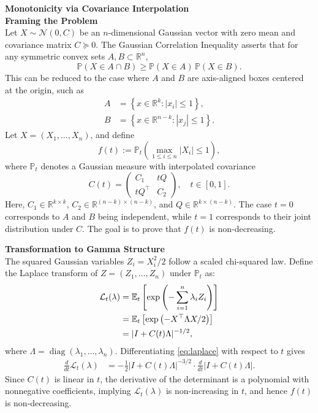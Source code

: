 \begin{technical}
{\Large\textbf{Monotonicity via Covariance Interpolation}}\\[0.7em]

\noindent\textbf{Framing the Problem}\\[0.5em]
Let \( X \sim \mathcal{N}(0, C) \) be an \( n \)-dimensional Gaussian vector with zero mean and covariance matrix \( C \succcurlyeq 0 \). The Gaussian Correlation Inequality asserts that for any symmetric convex sets \( A, B \subset \mathbb{R}^n \),
\[
\mathbb{P}(X \in A \cap B) \ge \mathbb{P}(X \in A)\,\mathbb{P}(X \in B).
\]
This can be reduced to the case where \( A \) and \( B \) are axis-aligned boxes centered at the origin, such as
\begin{align}
A &= \left\{ x \in \mathbb{R}^k : |x_i| \le 1 \right\}, \quad\\
B &= \left\{ x \in \mathbb{R}^{n-k} : |x_j| \le 1 \right\}.
\end{align}
Let \( X = (X_1, \dots, X_n) \), and define
\[
f(t) := \mathbb{P}_t\left( \max_{1 \le i \le n} |X_i| \le 1 \right),
\]
where \( \mathbb{P}_t \) denotes a Gaussian measure with interpolated covariance
\[
C(t) = 
\begin{pmatrix}
C_1 & tQ \\
tQ^\top & C_2
\end{pmatrix}, \quad t \in [0,1].
\]
Here, \( C_1 \in \mathbb{R}^{k \times k} \), \( C_2 \in \mathbb{R}^{(n-k) \times (n-k)} \), and \( Q \in \mathbb{R}^{k \times (n-k)} \). The case \( t = 0 \) corresponds to \( A \) and \( B \) being independent, while \( t = 1 \) corresponds to their joint distribution under \( C \). The goal is to prove that \( f(t) \) is non-decreasing.

\noindent\textbf{Transformation to Gamma Structure}\\[0.5em]
The squared Gaussian variables \( Z_i = X_i^2 / 2 \) follow a scaled chi-squared law. Define the Laplace transform of \( Z = (Z_1, \dots, Z_n) \) under \( \mathbb{P}_t \) as:
\begin{align}
\mathcal{L}_t(\lambda) 
&= \mathbb{E}_t \left[ \exp\left( -\sum_{i=1}^n \lambda_i Z_i \right) \right] \notag \\
&= \mathbb{E}_t \left[ \exp\left( -X^\top \Lambda X / 2 \right) \right] \notag \\
&= |I + C(t) \Lambda|^{-1/2}, \label{eq:laplace}
\end{align}
where \( \Lambda = \operatorname{diag}(\lambda_1, \dots, \lambda_n) \). Differentiating \eqref{eq:laplace} with respect to \( t \) gives
\begin{align}
\frac{d}{dt} \mathcal{L}_t(\lambda) 
&= -\frac{1}{2} |I + C(t)\Lambda|^{-3/2} \cdot \frac{d}{dt} |I + C(t)\Lambda|. \label{eq:laplace-deriv}
\end{align}
Since \( C(t) \) is linear in \( t \), the derivative of the determinant is a polynomial with nonnegative coefficients, implying \( \mathcal{L}_t(\lambda) \) is non-increasing in \( t \), and hence \( f(t) \) is non-decreasing.


\end{technical}
